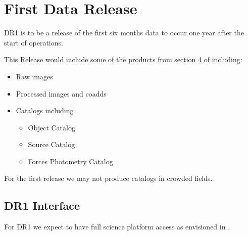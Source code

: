 \section{First Data Release } \label{sect:dr1}

DR1 is to be a release of the first six months data to occur one year after the start of operations.

This Release would include some of the products from section 4 of \DPDD including:

\begin{itemize}
\item  Raw images
\item  Processed images and coadds
\item  Catalogs including

\begin{itemize}
\item Object Catalog
\item Source Catalog
\item Forces Photometry Catalog
\end{itemize}

\end{itemize}

For the first release we may not produce catalogs in crowded fields.

\subsection {DR1 Interface}
For DR1 we expect to have full science platform access as envisioned in .
